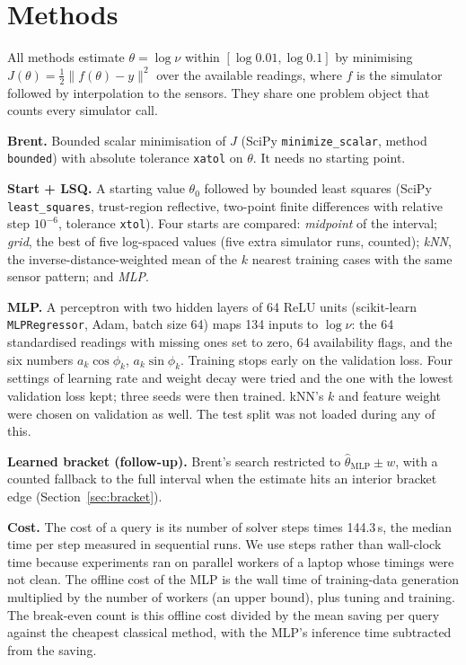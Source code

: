\section{Methods}
All methods estimate $\theta=\log\nu$ within $[\log 0.01,\log 0.1]$ by minimising
$J(\theta)=\tfrac12\lVert f(\theta)-y\rVert^2$ over the available readings, where $f$ is the simulator
followed by interpolation to the sensors. They share one problem object that counts every simulator call.

\textbf{Brent.} Bounded scalar minimisation of $J$ (SciPy \texttt{minimize\_scalar}, method
\texttt{bounded}) with absolute tolerance \texttt{xatol} on $\theta$. It needs no starting point.

\textbf{Start + LSQ.} A starting value $\theta_0$ followed by bounded least squares (SciPy
\texttt{least\_squares}, trust-region reflective, two-point finite differences with relative step
$10^{-6}$, tolerance \texttt{xtol}). Four starts are compared:
\emph{midpoint} of the interval; \emph{grid}, the best of five log-spaced values (five extra simulator runs,
counted); \emph{kNN}, the inverse-distance-weighted mean of the $k$ nearest training cases with the same
sensor pattern; and \emph{MLP}.

\textbf{MLP.} A perceptron with two hidden layers of 64 ReLU units (scikit-learn \texttt{MLPRegressor},
Adam, batch size 64) maps 134 inputs to $\log\nu$: the 64 standardised readings with missing ones set to
zero, 64 availability flags, and the six numbers $a_k\cos\phi_k$, $a_k\sin\phi_k$. %
Training stops early on the validation loss. Four settings of learning rate and weight decay were tried and
the one with the lowest validation loss kept; three seeds were then trained. %
kNN's $k$ and feature weight were chosen on validation as well. The test split was not loaded during any of
this.

\textbf{Learned bracket (follow-up).} Brent's search restricted to $\hat\theta_{\mathrm{MLP}}\pm w$, with a
counted fallback to the full interval when the estimate hits an interior bracket edge
(Section~\ref{sec:bracket}). %

\textbf{Cost.} The cost of a query is its number of solver steps times 144.3\,\textmu s, the median time per
step measured in sequential runs. %
We use steps rather than wall-clock time because experiments ran on parallel workers of a laptop whose
timings were not clean. The offline cost of the MLP is the wall time of training-data generation multiplied
by the number of workers (an upper bound), plus tuning and training. %
The break-even count is this offline cost divided by the mean saving per query against the cheapest
classical method, with the MLP's inference time subtracted from the saving.

